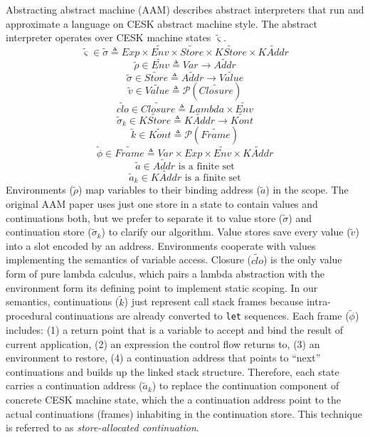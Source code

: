 \documentclass{article}
\begin{document}
Abstracting abstract machine (AAM) describes abstract interpreters that run and approximate a language on CESK abstract machine style.
The abstract interpreter operates over CESK machine states $\tilde{\varsigma}$.
\[
\tag{states}
\tilde{\varsigma}\in\tilde{\sigma} \triangleq Exp \times \widetilde{Env} \times \widetilde{Store}
\times \widetilde{KStore} \times \widetilde{KAddr}
\]
\[
\tag{environments}
\tilde{\rho} \in \widetilde{Env} \triangleq Var \to \widetilde{Addr}
\]
\[
\tag{stores}
\tilde{\sigma} \in \widetilde{Store} \triangleq \widetilde{Addr} \to \widetilde{Value}
\]
\[
\tag{abstract values}
\tilde{v} \in \widetilde{Value} \triangleq \mathcal{P}(\widetilde{Closure})
\]
\[
\tag{closures}
\widetilde{clo} \in \widetilde{Closure} \triangleq Lambda \times \widetilde{Env}
\]
\[
\tag{continuation stores}
\tilde{\sigma}_k \in \widetilde{KStore} \triangleq  \widetilde{KAddr} \to  \widetilde{Kont}
\]
\[
\tag{abstract continuations}
\widetilde{k} \in  \widetilde{Kont} \triangleq  \mathcal{P}(\widetilde{Frame})
\]
\[
\tag{stack frames}
\widetilde{\phi} \in  \widetilde{Frame} \triangleq Var \times Exp \times  \widetilde{Env} \times  \widetilde{KAddr}
\]
\[
\tag{value addresses}
\tilde{a} \in \widetilde{Addr} \mbox{ is a finite set}
\]
\[
\tag{continuation addresses}
\tilde{a}_k \in \widetilde{KAddr} \mbox{ is a finite set}
\]
Environments ($\tilde{\rho}$) map variables to their binding address ($\tilde{a}$) in the scope.
The original AAM paper uses just one store in a state to contain values and continuations both, but we prefer to separate it to value store ($\tilde{\sigma}$) and continuation store ($\tilde{\sigma}_k$) to clarify our algorithm.
Value stores save every value ($\tilde{v}$) into a slot encoded by an address. Environments cooperate with values implementing the semantics of variable access.
Closure ($\widetilde{clo}$) is the only value form of pure lambda calculus, which pairs a lambda abstraction with the environment form its defining point to implement static scoping.
In our semantics, continuations ($\widetilde{k}$) just represent call stack frames because intra-procedural continuations are already converted to \verb|let| sequences.
Each frame ($\widetilde{\phi}$) includes:
(1) a return point that is a variable to accept and bind the result of current application,
(2) an expression the control flow returns to,
(3) an environment to restore,
(4) a continuation address that points to ``next'' continuations and builds up the linked stack structure.
Therefore, each state carries a continuation address ($\tilde{a}_k$) to replace the continuation component of concrete CESK machine state, which the a continuation address point to the actual continuations (frames) inhabiting in the continuation store.
This technique is referred to as \emph{store-allocated continuation}.
\end{document}

